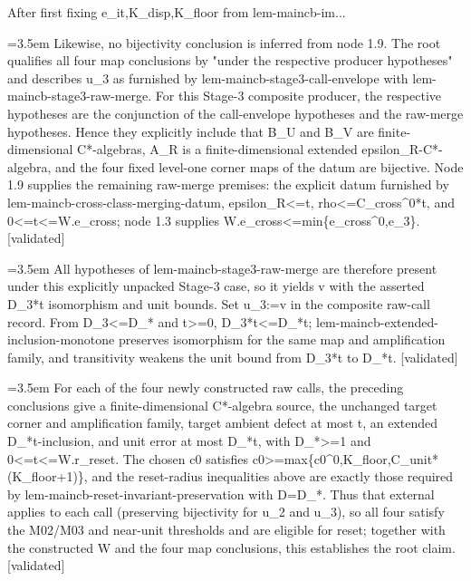 \documentclass{article}
\newcommand{\step}[1]{\par\noindent\hangindent=3.5em\hangafter=1%
  \makebox[3.5em][l]{\textbf{#1.}}}
\newcommand{\steptag}[1]{\hfill{\small\textsf{[#1]}}}
\begin{document}
\begin{proofbox}{After first fixing e\_it,K\_disp,K\_floor from lem-maincb-im...}
\step{1.10.2} Likewise, no bijectivity conclusion is inferred from node 1.9. The root qualifies all four map conclusions by "under the respective producer hypotheses" and describes u\_3 as furnished by lem-maincb-stage3-call-envelope with lem-maincb-stage3-raw-merge. For this Stage-3 composite producer, the respective hypotheses are the conjunction of the call-envelope hypotheses and the raw-merge hypotheses. Hence they explicitly include that B\_U and B\_V are finite-dimensional C*-algebras, A\_R is a finite-dimensional extended epsilon\_R-C*-algebra, and the four fixed level-one corner maps of the datum are bijective. Node 1.9 supplies the remaining raw-merge premises: the explicit datum furnished by lem-maincb-cross-class-merging-datum, epsilon\_R<=t, rho<=C\_cross\textasciicircum{}0*t, and 0<=t<=W.e\_cross; node 1.3 supplies W.e\_cross<=min\{e\_cross\textasciicircum{}0,e\_3\}. \steptag{validated} \\[4pt]
\step{1.10.3} All hypotheses of lem-maincb-stage3-raw-merge are therefore present under this explicitly unpacked Stage-3 case, so it yields v with the asserted D\_3*t isomorphism and unit bounds. Set u\_3:=v in the composite raw-call record. From D\_3<=D\_* and t>=0, D\_3*t<=D\_*t; lem-maincb-extended-inclusion-monotone preserves isomorphism for the same map and amplification family, and transitivity weakens the unit bound from D\_3*t to D\_*t. \steptag{validated} \\[4pt]
\step{1.11} For each of the four newly constructed raw calls, the preceding conclusions give a finite-dimensional C*-algebra source, the unchanged target corner and amplification family, target ambient defect at most t, an extended D\_*t-inclusion, and unit error at most D\_*t, with D\_*>=1 and 0<=t<=W.r\_reset. The chosen c0 satisfies c0>=max\{c0\textasciicircum{}0,K\_floor,C\_unit*(K\_floor+1)\}, and the reset-radius inequalities above are exactly those required by lem-maincb-reset-invariant-preservation with D=D\_*. Thus that external applies to each call (preserving bijectivity for u\_2 and u\_3), so all four satisfy the M02/M03 and near-unit thresholds and are eligible for reset; together with the constructed W and the four map conclusions, this establishes the root claim. \steptag{validated} \\[4pt]
\end{proofbox}
\end{document}
